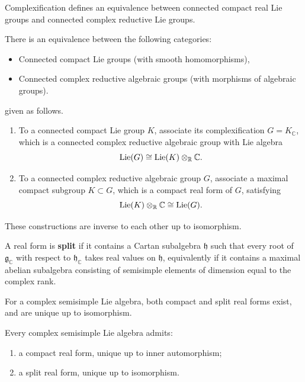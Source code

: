 \documentclass[12pt]{article}
\begin{document}
Complexification defines an equivalence between connected compact real Lie groups and connected complex reductive Lie groups.

\begin{theorem}
    There is an equivalence between the following categories:
    \begin{itemize}
        \item Connected compact Lie groups (with smooth homomorphisms),
        \item Connected complex reductive algebraic groups (with morphisms of algebraic groups).
    \end{itemize}
    given as follows.

    \begin{enumerate}
        \item To a connected compact Lie group $K$, associate its complexification
              $G = K_{\mathbb C}$, which is a connected complex reductive algebraic group
              with Lie algebra
              \[
                  \operatorname{Lie}(G) \cong \operatorname{Lie}(K) \otimes_{\mathbb R} \mathbb C.
              \]

        \item To a connected complex reductive algebraic group $G$, associate a
              maximal compact subgroup $K \subset G$, which is a compact real form of $G$,
              satisfying
              \[
                  \operatorname{Lie}(K) \otimes_{\mathbb R} \mathbb C \cong \operatorname{Lie}(G).
              \]
    \end{enumerate}

    These constructions are inverse to each other up to isomorphism.
\end{theorem}

\begin{definition}
    A real form is \textbf{split} if it contains a Cartan subalgebra $\mathfrak h$ such that every root of $\mathfrak g_\mathbb C$ with respect to $\mathfrak h_\mathbb C$ takes real values on $\mathfrak h$, equivalently if it contains a maximal abelian subalgebra consisting of semisimple elements of dimension equal to the complex rank.
\end{definition}

For a complex semisimple Lie algebra, both compact and split real forms exist, and are unique up to isomorphism.

\begin{theorem}
    Every complex semisimple Lie algebra admits:
    \begin{enumerate}
        \item a compact real form, unique up to inner automorphism;
        \item a split real form, unique up to isomorphism.
    \end{enumerate}
\end{theorem}
\end{document}
